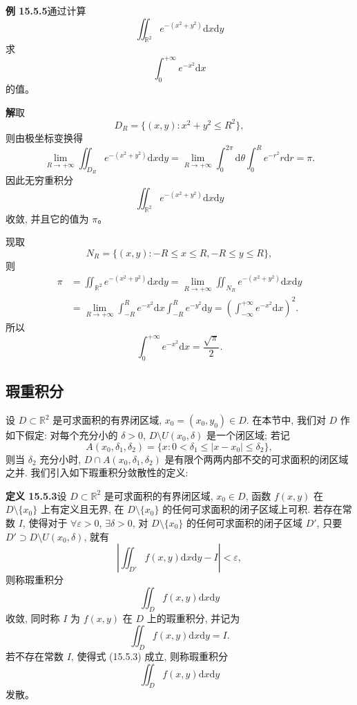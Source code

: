 \documentclass[UTF8, 12pt, fontset=fandol, oneside]{ctexart}
\begin{document}
\noindent\textbf{例 15.5.5}\quad 通过计算
\[
  \iint_{\mathbb R^2}e^{-(x^2+y^2)}\mathrm dx\mathrm dy
\]
求
\[
  \int_0^{+\infty}e^{-x^2}\mathrm dx
\]
的值。

\noindent\textbf{解}\quad 取
\[
  D_R=\{(x,y):x^2+y^2\leqslant R^2\},
\]
则由极坐标变换得
\[
  \lim_{R\to+\infty}\iint_{D_R}e^{-(x^2+y^2)}\mathrm dx\mathrm dy
  =\lim_{R\to+\infty}\int_0^{2\pi}\mathrm d\theta\int_0^R e^{-r^2}r\mathrm dr=\pi.
\]
因此无穷重积分
\[
  \iint_{\mathbb R^2}e^{-(x^2+y^2)}\mathrm dx\mathrm dy
\]
收敛, 并且它的值为 $\pi$。

现取
\[
  N_R=\{(x,y):-R\leqslant x\leqslant R,-R\leqslant y\leqslant R\},
\]
则
\[
\begin{aligned}
  \pi&=\iint_{\mathbb R^2}e^{-(x^2+y^2)}\mathrm dx\mathrm dy
  =\lim_{R\to+\infty}\iint_{N_R}e^{-(x^2+y^2)}\mathrm dx\mathrm dy\\
  &=\lim_{R\to+\infty}\int_{-R}^R e^{-x^2}\mathrm dx
  \int_{-R}^R e^{-y^2}\mathrm dy
  =\left(\int_{-\infty}^{+\infty}e^{-x^2}\mathrm dx\right)^2.
\end{aligned}
\]
所以
\[
  \int_0^{+\infty}e^{-x^2}\mathrm dx=\frac{\sqrt\pi}2.
\]

\subsection{瑕重积分}

设 $D\subset\mathbb R^2$ 是可求面积的有界闭区域, $x_0=(x_0,y_0)\in D$. 在本节中, 我们对 $D$ 作如下假定: 对每个充分小的 $\delta>0$, $D\setminus U(x_0,\delta)$ 是一个闭区域; 若记
\[
  A(x_0,\delta_1,\delta_2)=\{x:0<\delta_1\leqslant |x-x_0|\leqslant\delta_2\},
\]
则当 $\delta_2$ 充分小时, $D\cap A(x_0,\delta_1,\delta_2)$ 是有限个两两内部不交的可求面积的闭区域之并. 我们引入如下瑕重积分敛散性的定义:

\noindent\textbf{定义 15.5.3}\quad 设 $D\subset\mathbb R^2$ 是可求面积的有界闭区域, $x_0\in D$, 函数 $f(x,y)$ 在 $D\setminus\{x_0\}$ 上有定义且无界, 在 $D\setminus\{x_0\}$ 的任何可求面积的闭子区域上可积. 若存在常数 $I$, 使得对于 $\forall\varepsilon>0$, $\exists\delta>0$, 对 $D\setminus\{x_0\}$ 的任何可求面积的闭子区域 $D'$, 只要 $D'\supset D\setminus U(x_0,\delta)$, 就有
\begin{equation}
  \left|\iint_{D'}f(x,y)\mathrm dx\mathrm dy-I\right|<\varepsilon,
  \tag{15.5.3}
\end{equation}
则称瑕重积分
\[
  \iint_D f(x,y)\mathrm dx\mathrm dy
\]
收敛, 同时称 $I$ 为 $f(x,y)$ 在 $D$ 上的瑕重积分, 并记为
\[
  \iint_D f(x,y)\mathrm dx\mathrm dy=I.
\]
若不存在常数 $I$, 使得式 (15.5.3) 成立, 则称瑕重积分
\[
  \iint_D f(x,y)\mathrm dx\mathrm dy
\]
发散。
\end{document}
